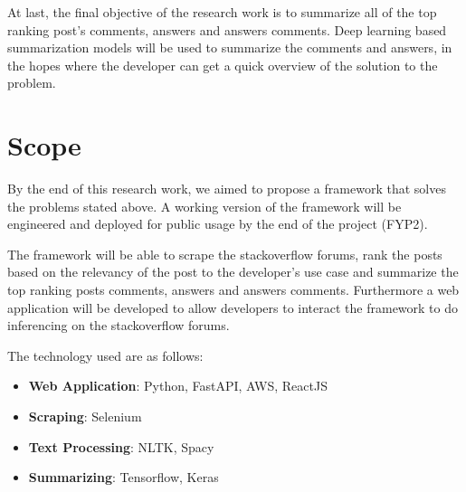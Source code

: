 At last, the final objective of the research work is to summarize all of the top ranking post's comments, answers and answers comments. Deep learning based summarization models will be used to summarize the comments and answers, in the hopes where the developer can get a quick overview of the solution to the problem.

\vspace{1cm}
\section{Scope}
By the end of this research work, we aimed to propose a framework that solves the problems stated above. A working version of the framework will be engineered and deployed for public usage by the end of the project (FYP2). 

The framework will be able to scrape the stackoverflow forums, rank the posts based on the relevancy of the post to the developer's use case and summarize the top ranking posts comments, answers and answers comments. Furthermore a web application will be developed to allow developers to interact the framework to do inferencing on the stackoverflow forums.

The technology used are as follows:
\begin{itemize}
    \item \textbf{Web Application}: Python, FastAPI, AWS, ReactJS
    \item \textbf{Scraping}: Selenium
    \item \textbf{Text Processing}: NLTK, Spacy
    \item \textbf{Summarizing}: Tensorflow, Keras
\end{itemize}